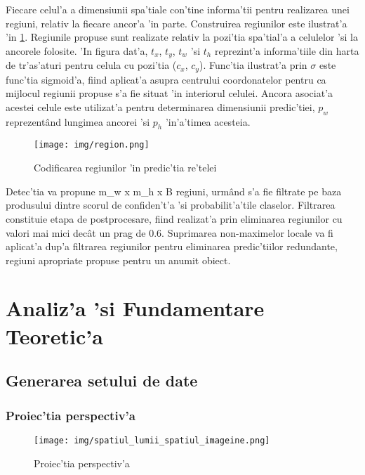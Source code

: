 \documentclass[12pt,a4paper,twoside]{report}
\begin{document}
Fiecare celul'a a dimensiunii spa'tiale con'tine informa'tii pentru realizarea unei regiuni, relativ la fiecare ancor'a 'in parte. Construirea regiunilor este ilustrat'a 'in \ref{fig:yolo1}. Regiunile propuse sunt realizate relativ la pozi'tia spa'tial'a a celulelor 'si la ancorele folosite. 'In figura dat'a, \textit{$t_x$}, \textit{$t_y$}, \textit{$t_w$} 'si \textit{$t_h$} reprezint'a informa'tiile din harta de tr'as'aturi pentru celula cu pozi'tia (\textit{$c_x$}, \textit{$c_y$}). Func'tia ilustrat'a prin $\sigma$ este func'tia sigmoid'a, fiind aplicat'a asupra centrului coordonatelor pentru ca mijlocul regiunii propuse s'a fie situat 'in interiorul celulei. Ancora asociat'a acestei celule este utilizat'a pentru determinarea dimensiunii predic'tiei, \textit{$p_w$} reprezent\^and lungimea ancorei 'si \textit{$p_h$} 'in'a'timea acesteia.

\begin{figure}[H]
  \texttt{[image: img/region.png]}
  \centering
  \caption{Codificarea regiunilor 'in predic'tia re'telei\protect\footnotemark}
  \label{fig:yolo1}
\end{figure}

Detec'tia va propune m\_w x m\_h x B regiuni, urm\^and s'a fie filtrate pe baza produsului dintre scorul de confiden't'a 'si probabilit'a'tile claselor. Filtrarea constituie etapa de postprocesare, fiind realizat'a prin eliminarea regiunilor cu valori mai mici dec\^at un prag de 0.6. Suprimarea non-maximelor locale va fi aplicat'a dup'a filtrarea regiunilor pentru eliminarea predic'tiilor redundante, regiuni apropriate propuse pentru un anumit obiect.

\chapter{Analiz'a 'si Fundamentare Teoretic'a}
\label{ch:analysis}
\section{Generarea setului de date}
\subsection{Proiec'tia perspectiv'a}

\begin{figure}[H]
  \texttt{[image: img/spatiul\_lumii\_spatiul\_imageine.png]}
  \centering
  \caption{Proiec'tia perspectiv'a}
  \label{fig:from_world_to_image}
\end{figure}
\end{document}
